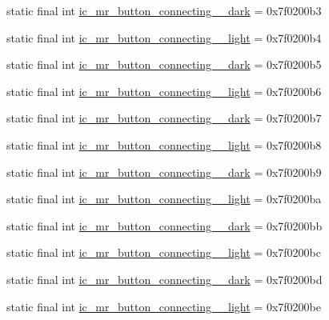 \begin{CompactItemize}
\item 
static final int \hyperlink{classandroid_1_1support_1_1v4_1_1_r_1_1drawable_3c423bcc4121660d474436b541ad7fb5}{ic\_\-mr\_\-button\_\-connecting\_\_\-dark} = 0x7f0200b3
\item 
static final int \hyperlink{classandroid_1_1support_1_1v4_1_1_r_1_1drawable_e051c21b2bfe5fb576ebe2cb6c6b2a9a}{ic\_\-mr\_\-button\_\-connecting\_\_\-light} = 0x7f0200b4
\item 
static final int \hyperlink{classandroid_1_1support_1_1v4_1_1_r_1_1drawable_19139761a16f02b1730b3bdfcb398906}{ic\_\-mr\_\-button\_\-connecting\_\_\-dark} = 0x7f0200b5
\item 
static final int \hyperlink{classandroid_1_1support_1_1v4_1_1_r_1_1drawable_ac9c4c6f75ab0e16d156ac77c8f95e33}{ic\_\-mr\_\-button\_\-connecting\_\_\-light} = 0x7f0200b6
\item 
static final int \hyperlink{classandroid_1_1support_1_1v4_1_1_r_1_1drawable_69240cad958df94b7821035d197ba51c}{ic\_\-mr\_\-button\_\-connecting\_\_\-dark} = 0x7f0200b7
\item 
static final int \hyperlink{classandroid_1_1support_1_1v4_1_1_r_1_1drawable_a5f236bd26bed263f95bad37dae24f64}{ic\_\-mr\_\-button\_\-connecting\_\_\-light} = 0x7f0200b8
\item 
static final int \hyperlink{classandroid_1_1support_1_1v4_1_1_r_1_1drawable_c76a8709afce1321b72f857d6b9da89c}{ic\_\-mr\_\-button\_\-connecting\_\_\-dark} = 0x7f0200b9
\item 
static final int \hyperlink{classandroid_1_1support_1_1v4_1_1_r_1_1drawable_65bc64278b4815fd46a8b8545f5b531e}{ic\_\-mr\_\-button\_\-connecting\_\_\-light} = 0x7f0200ba
\item 
static final int \hyperlink{classandroid_1_1support_1_1v4_1_1_r_1_1drawable_ff476fc33ec3868da98ec9ab3543dd59}{ic\_\-mr\_\-button\_\-connecting\_\_\-dark} = 0x7f0200bb
\item 
static final int \hyperlink{classandroid_1_1support_1_1v4_1_1_r_1_1drawable_3940c0d165e9d93c11193f9fe22d2a9d}{ic\_\-mr\_\-button\_\-connecting\_\_\-light} = 0x7f0200bc
\item 
static final int \hyperlink{classandroid_1_1support_1_1v4_1_1_r_1_1drawable_91fb1ede5c1e359699c319045e133059}{ic\_\-mr\_\-button\_\-connecting\_\_\-dark} = 0x7f0200bd
\item 
static final int \hyperlink{classandroid_1_1support_1_1v4_1_1_r_1_1drawable_c7bf8a294fee29a655e6600ebd9a043e}{ic\_\-mr\_\-button\_\-connecting\_\_\-light} = 0x7f0200be

\end{CompactItemize}
